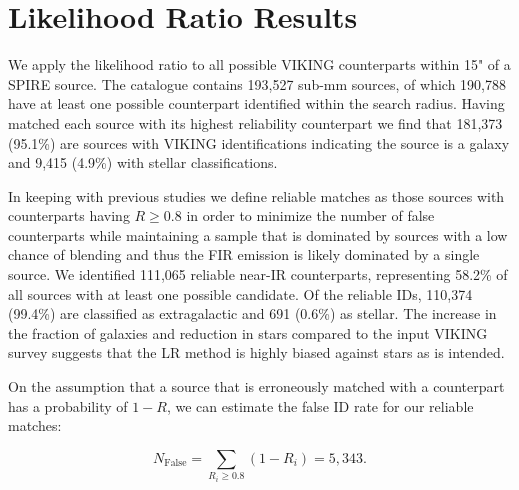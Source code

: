 \section{Likelihood Ratio Results}
\label{sec:lr_results}

We apply the likelihood ratio to all possible VIKING counterparts within 15" of a SPIRE source. The catalogue contains 193,527 sub-mm sources, of which 190,788 have at least one possible counterpart identified within the search radius. Having matched each source with its highest reliability counterpart we find that 181,373 (95.1\%) are sources with VIKING identifications indicating the source is a galaxy and 9,415 (4.9\%) with stellar classifications. 

In keeping with previous studies we define reliable matches as those sources with counterparts having $R \geq 0.8$ in order to minimize the number of false counterparts while maintaining a sample that is dominated by sources with a low chance of blending and thus the FIR emission is likely dominated by a single source. We identified 111,065 reliable near-IR counterparts, representing 58.2\% of all sources with at least one possible candidate. Of the reliable IDs, 110,374 (99.4\%) are classified as extragalactic and 691 (0.6\%) as stellar. The increase in the fraction of galaxies and reduction in stars compared to the input VIKING survey suggests that the LR method is highly biased against stars as is intended.

On the assumption that a source that is erroneously matched with a counterpart has a probability of $1 - R$, we can estimate the false ID rate for our reliable matches:

\begin{equation}
    N_{\textrm{False}} = \sum_{R_i \geq 0.8} (1 - R_i) = 5,343.
\label{eq:false_ids}
\end{equation}

